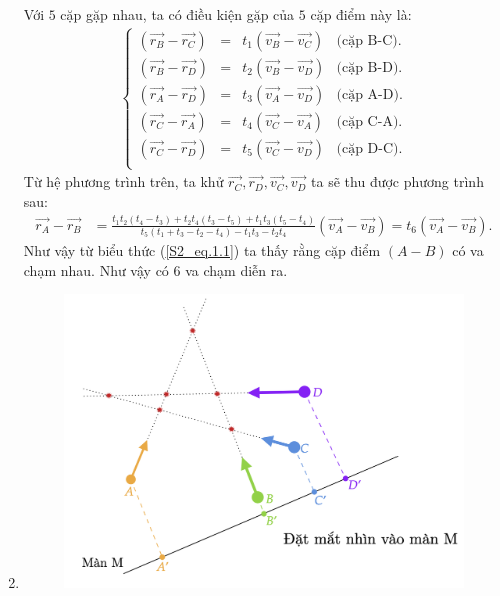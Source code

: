 \begin{enumerate}
\begin{center}
{\begin{tikzpicture}[x=0.75pt,y=0.75pt,yscale=-1,xscale=1]
\end{tikzpicture}
    }
\end{center}
Với $5$ cặp gặp nhau, ta có điều kiện gặp của $5$ cặp điểm này là:
\begin{align*}
\left\{
    \begin{array}{rrrr}
    \left(\Vec{r_B} - \Vec{r_C} \right)   & = & t_1 \left( \Vec{v_B} - \Vec{v_C} \right) & \text{(cặp B-C).} \\
    \left(\Vec{r_B} - \Vec{r_D} \right)   & = & t_2 \left( \Vec{v_B} - \Vec{v_D} \right) & \text{(cặp B-D).} \\
    \left(\Vec{r_A} - \Vec{r_D} \right)   & = & t_3 \left( \Vec{v_A} - \Vec{v_D} \right) & \text{(cặp A-D).} \\
    \left(\Vec{r_C} - \Vec{r_A} \right)   & = & t_4 \left( \Vec{v_C} - \Vec{v_A} \right) & \text{(cặp C-A).} \\
    \left(\Vec{r_C} - \Vec{r_D} \right)   & = & t_5 \left( \Vec{v_C} - \Vec{v_D} \right) & \text{(cặp D-C).} \\
    \end{array}
\right.
\end{align*}
Từ hệ phương trình trên, ta khử $\Vec{r_C}, \Vec{r_D}, \Vec{v_C}, \Vec{v_D}$ ta sẽ thu được phương trình sau:
\begin{align}
    \Vec{r_A} - \Vec{r_B} & =  \frac{t_1 t_2 \left(t_4 - t_3 \right) + t_2 t_4 \left( t_3 - t_5 \right) +t_1 t_3 \left(t_5 - t_4 \right)}{t_5 \left( t_1 + t_3 - t_2 - t_4 \right) - t_1 t_3 - t_2 t_4} \left( \Vec{v_A} - \Vec{v_B} \right) = t_6 \left( \Vec{v_A} - \Vec{v_B} \right).
    \label{S2_eq.1.1}
\end{align}
Như vậy từ biểu thức (\ref{S2_eq.1.1}) ta thấy rằng cặp điểm $\left(A-B\right)$ có va chạm nhau. Như vậy có $6$ va chạm diễn ra.
\item 
\begin{figure}[ht]
    \centering
    \includegraphics[scale=0.45]{Problem_1/Image/S2.2.1.png}
    \caption{}
    \label{S2.2.1}
\end{figure}


\end{enumerate}
